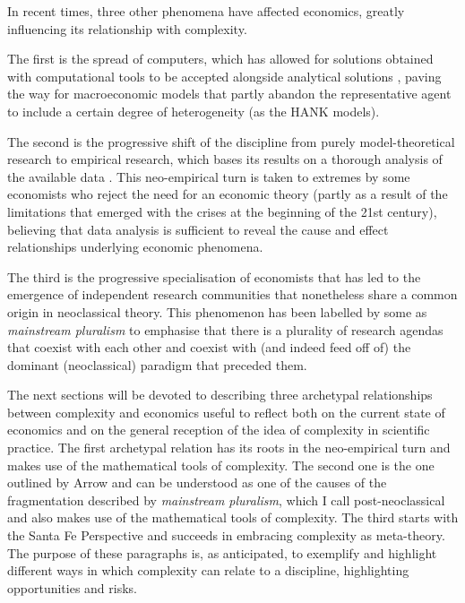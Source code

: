In recent times, three other phenomena have affected economics, greatly influencing its relationship with complexity.

The first is the spread of computers, which has allowed for solutions obtained with computational tools to be accepted alongside analytical solutions \parencite{cherrier2023, backhouse2016}, paving the way for macroeconomic models that partly abandon the representative agent to include a certain degree of heterogeneity (as the HANK models).

The second is the progressive shift of the discipline from purely model-theoretical research to empirical research, which bases its results on a thorough analysis of the available data \parencite{cherrier2018, backhouse2017}.
This neo-empirical turn is taken to extremes by some economists who reject the need for an economic theory (partly as a result of the limitations that emerged with the crises at the beginning of the 21st century), believing that data analysis is sufficient to reveal the cause and effect relationships underlying economic phenomena.

The third is the progressive specialisation of economists that has led to the emergence of independent research communities that nonetheless share a common origin in neoclassical theory. This phenomenon has been labelled by some as \textit{mainstream pluralism} \parencite{cedrini2018, davis2006, davis2019a} to emphasise that there is a plurality of research agendas that coexist with each other and coexist with (and indeed feed off of) the dominant (neoclassical) paradigm that preceded them.

The next sections will be devoted to describing three archetypal relationships between complexity and economics useful to reflect both on the current state of economics and on the general reception of the idea of complexity in scientific practice.
The first archetypal relation has its roots in the neo-empirical turn and makes use of the mathematical tools of complexity. The second one is the one outlined by Arrow and can be understood as one of the causes of the fragmentation described by \textit{mainstream pluralism}, which I call post-neoclassical and also makes use of the mathematical tools of complexity.
The third starts with the Santa Fe Perspective and succeeds in embracing complexity as meta-theory.
The purpose of these paragraphs is, as anticipated, to exemplify and highlight different ways in which complexity can relate to a discipline, highlighting opportunities and risks.

